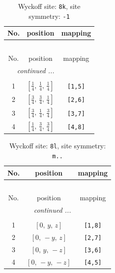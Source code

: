 \documentclass[fleqn,8pt]{jsarticle}
\begin{document}
\begin{longtable}{ccc}
\caption{Wyckoff site: {\tt 8k}, site symmetry: {\tt -1}}
 \\
 \hline \hline
No. & position & mapping \\ \hline \endfirsthead

\multicolumn{2}{l}{\tablename\ \thetable{}} \\
 \hline \hline
No. & position & mapping \\ \hline \endhead

 \hline \hline
\multicolumn{2}{r}{\footnotesize\it continued ...} \\ \endfoot

 \hline \hline
\multicolumn{2}{r}{} \\ \endlastfoot

1 & $\left[ \frac{1}{4},\, \frac{1}{4},\, \frac{1}{4} \right]$ & {\tt [1,5]} \\ \hline
2 & $\left[ \frac{3}{4},\, \frac{3}{4},\, \frac{1}{4} \right]$ & {\tt [2,6]} \\ \hline
3 & $\left[ \frac{3}{4},\, \frac{1}{4},\, \frac{3}{4} \right]$ & {\tt [3,7]} \\ \hline
4 & $\left[ \frac{1}{4},\, \frac{3}{4},\, \frac{3}{4} \right]$ & {\tt [4,8]} \\
\end{longtable}
\renewcommand{\arraystretch}{1.2}
\begin{longtable}{ccc}
\caption{Wyckoff site: {\tt 8l}, site symmetry: {\tt m..}}
 \\
 \hline \hline
No. & position & mapping \\ \hline \endfirsthead

\multicolumn{2}{l}{\tablename\ \thetable{}} \\
 \hline \hline
No. & position & mapping \\ \hline \endhead

 \hline \hline
\multicolumn{2}{r}{\footnotesize\it continued ...} \\ \endfoot

 \hline \hline
\multicolumn{2}{r}{} \\ \endlastfoot

1 & $\left[ 0,\, y,\, z \right]$ & {\tt [1,8]} \\ \hline
2 & $\left[ 0,\, - y,\, z \right]$ & {\tt [2,7]} \\ \hline
3 & $\left[ 0,\, y,\, - z \right]$ & {\tt [3,6]} \\ \hline
4 & $\left[ 0,\, - y,\, - z \right]$ & {\tt [4,5]} \\
\end{longtable}
\end{document}
